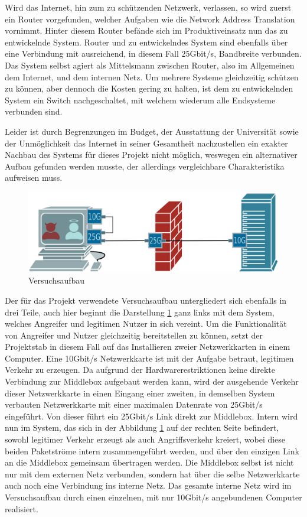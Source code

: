 \documentclass[../review_2.tex]{subfiles}
\begin{document}
Wird das Internet, hin zum zu schützenden Netzwerk, verlassen, so wird zuerst ein Router vorgefunden, welcher Aufgaben wie die Network Address Translation vornimmt. Hinter diesem Router befände sich im Produktiveinsatz nun das zu entwickelnde System. Router und zu entwickelndes System sind ebenfalls über eine Verbindung mit ausreichend, in diesem Fall 25Gbit/s, Bandbreite verbunden. Das System selbst agiert als Mittelsmann zwischen Router, also im Allgemeinen dem Internet, und dem internen Netz. Um mehrere Systeme gleichzeitig schützen zu können, aber dennoch die Kosten gering zu halten, ist dem zu entwickelnden System ein Switch nachgeschaltet, mit welchem wiederum alle Endsysteme verbunden sind.

Leider ist durch Begrenzungen im Budget, der Ausstattung der Universität sowie der Unmöglichkeit das Internet in seiner Gesamtheit nachzustellen ein exakter Nachbau des Systems für dieses Projekt nicht möglich, weswegen ein alternativer Aufbau gefunden werden musste, der allerdings vergleichbare Charakteristika aufweisen muss.

\begin{figure}[h]
    \centering
    \includegraphics[width=0.7\linewidth]{img/Netwerkplan-Versuch}
    \caption{Versuchsaufbau}
    \label{fig:Versuchsaufbau}
\end{figure}

Der für das Projekt verwendete Versuchsaufbau untergliedert sich ebenfalls in drei Teile, auch hier beginnt die Darstellung \ref{fig:Versuchsaufbau} ganz links mit dem System, welches Angreifer und legitimen Nutzer in sich vereint. Um die Funktionalität von Angreifer und Nutzer gleichzeitig bereitstellen zu können, setzt der Projektstab in diesem Fall auf das Installieren zweier Netzwerkkarten in einem Computer. Eine 10Gbit/s Netzwerkkarte ist mit der Aufgabe betraut, legitimen Verkehr zu erzeugen. Da aufgrund der Hardwarerestriktionen keine direkte Verbindung zur Middlebox aufgebaut werden kann, wird der ausgehende Verkehr dieser Netzwerkkarte in einen Eingang einer zweiten, in demselben System verbauten Netzwerkkarte mit einer maximalen Datenrate von 25Gbit/s eingeführt. Von dieser führt ein 25Gbit/s Link direkt zur Middlebox. Intern wird nun im System, das sich in der Abbildung \ref{fig:Versuchsaufbau} auf der rechten Seite befindert, sowohl legitimer Verkehr erzeugt als auch Angriffsverkehr kreiert, wobei diese beiden Paketströme intern zusammengeführt werden, und über den einzigen Link an die Middlebox gemeinsam übertragen werden. Die Middlebox selbst ist nicht nur mit dem externen Netz verbunden, sondern hat über die selbe Netzwerkkarte auch noch eine Verbindung ins interne Netz. Das gesamte interne Netz wird im Versuchsaufbau durch einen einzelnen, mit nur 10Gbit/s angebundenen Computer realisiert.
\end{document}
